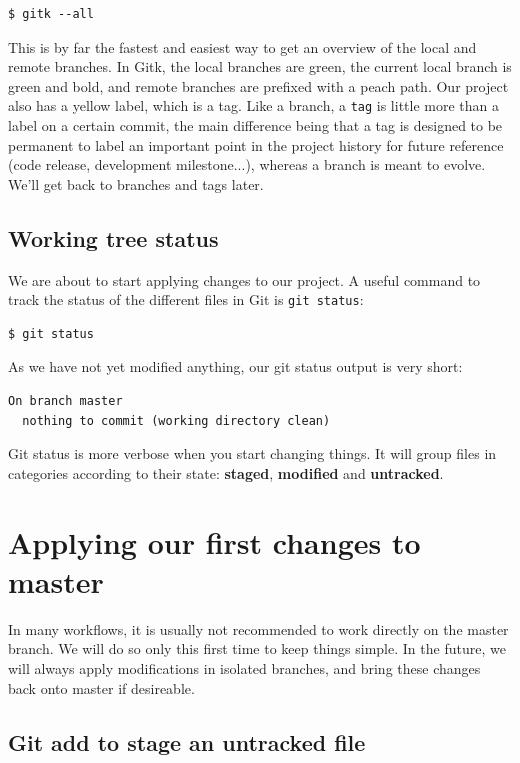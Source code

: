 \documentclass{tufte-handout}
\begin{document}
\begin{lstlisting}[style=BashInputStyle]
  $ gitk --all
\end{lstlisting}

This is by far the fastest and easiest way to get an overview of the local and remote branches.
In Gitk, the local branches are green, the current local branch is green and bold, and remote branches are prefixed with a peach path.
Our project also has a yellow label, which is a tag.
Like a branch, a \texttt{tag} is little more than a label on a certain commit, the main difference being that a tag is designed to be permanent to label an important point in the project history for future reference (code release, development milestone...), whereas a branch is meant to evolve.
We'll get back to branches and tags later.

\subsection{Working tree status}

We are about to start applying changes to our project.
A useful command to track the status of the different files in Git is \texttt{git status}:

\begin{lstlisting}[style=BashInputStyle]
  $ git status
\end{lstlisting}

As we have not yet modified anything, our git status output is very short:

\begin{lstlisting}[style=BashInputStyle]
  On branch master
  nothing to commit (working directory clean)
\end{lstlisting}

Git status is more verbose when you start changing things.
It will group files in categories according to their state: \textbf{staged}, \textbf{modified} and \textbf{untracked}.

\section{Applying our first changes to master}
In many workflows, it is usually not recommended to work directly on the master branch.
We will do so only this first time to keep things simple.
In the future, we will always apply modifications in isolated branches, and bring these changes back onto master if desireable.

\subsection{Git add to stage an untracked file}
\end{document}
